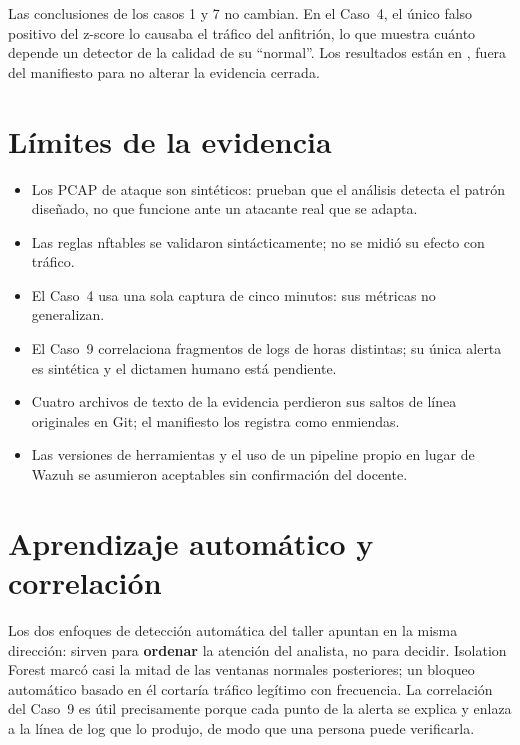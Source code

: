 Las conclusiones de los casos 1 y 7 no cambian. En el Caso~4, el único falso positivo del z-score lo causaba el tráfico del anfitrión, lo que muestra cuánto depende un detector de la calidad de su ``normal''. Los resultados están en , fuera del manifiesto para no alterar la evidencia cerrada.

\section{Límites de la evidencia}
\begin{itemize}
\item Los PCAP de ataque son sintéticos: prueban que el análisis detecta el patrón diseñado, no que funcione ante un atacante real que se adapta.
\item Las reglas nftables se validaron sintácticamente; no se midió su efecto con tráfico.
\item El Caso~4 usa una sola captura de cinco minutos: sus métricas no generalizan.
\item El Caso~9 correlaciona fragmentos de logs de horas distintas; su única alerta es sintética y el dictamen humano está pendiente.
\item Cuatro archivos de texto de la evidencia perdieron sus saltos de línea originales en Git; el manifiesto los registra como enmiendas.
\item Las versiones de herramientas y el uso de un pipeline propio en lugar de Wazuh se asumieron aceptables sin confirmación del docente.
\end{itemize}

\section{Aprendizaje automático y correlación}
Los dos enfoques de detección automática del taller apuntan en la misma dirección: sirven para \textbf{ordenar} la atención del analista, no para decidir. Isolation Forest marcó casi la mitad de las ventanas normales posteriores; un bloqueo automático basado en él cortaría tráfico legítimo con frecuencia. La correlación del Caso~9 es útil precisamente porque cada punto de la alerta se explica y enlaza a la línea de log que lo produjo, de modo que una persona puede verificarla.
